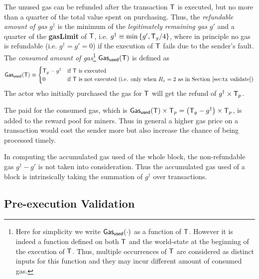 	The unused gas can be refunded after the transaction $\textsf{T}$ is executed, but no more than a quarter of the total value spent on purchasing. 
	Thus, the \emph{refundable amount of gas} $g^{\dagger}$ is the minimum of the \emph{legitimately remaining gas} $g'$ and a quarter of the \textbf{gasLimit} of $\textsf{T}$,
	i.e. $g^{\dagger}\equiv \min{\left \{{g', \textsf{T}_g/4} \right \}}$, 
	where in principle no gas is refundable (i.e. $g^{\dagger} = g' = 0$) if the execution of $\textsf{T}$ fails due to the sender's fault. 
	The \emph{consumed amount of gas}\footnote{Here for simplicity we write $\mathsf{Gas_{used}}(\cdot)$ as a function of $\textsf{T}$. However it is indeed a function defined on both $\textsf{T}$ and the world-state at the beginning of the execution of $\textsf{T}$. Thus, multiple occurrences of $\textsf{T}$ are considered as distinct inputs for this function and they may incur different amount of consumed gas.} $\mathsf{Gas_{used}}(\textsf{T})$ is defined as
	\begin{align*}
		\mathsf{Gas_{used}}(\textsf{T}) \equiv \begin{cases}
			\textsf{T}_g-g^{\dagger} & \mbox{if $\textsf{T}$ is executed}\\
			0 & \mbox{if $\textsf{T}$ is not executed (i.e. only when $R_z=2$ as in Section~\ref{sec:tx validate})}
		\end{cases} 
	\end{align*}
	The actor who initially purchased the gas for $\textsf{T}$ will get the refund of $g^{\dagger}\times\textsf{T}_p$.

The \coinsign paid for the consumed gas, which is $\mathsf{Gas_{used}}(\textsf{T})\times\textsf{T}_p = \left(\textsf{T}_g-g^{\dagger}\right)\times \textsf{T}_p$, is added to the reward pool for miners. 
Thus in general a higher gas price on a transaction would cost the sender more but also increase the chance of being processed timely.

In computing the accumulated gas used of the whole block, the non-refundable gas $g^{\dagger} - g'$ is not taken into consideration. Thus the accumulated gas used of a block is intrinsically taking the summation of $g^{\dagger}$ over transactions.

\subsection{Pre-execution Validation}
\label{sec:tx validate}

